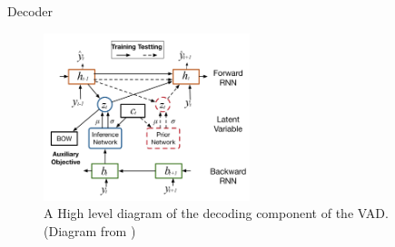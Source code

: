\documentclass[aspectratio=169, 11pt]{beamer}
\begin{document}
\begin{frame}{Decoder}
  \begin{figure}[!ht]
    \centering
    \includegraphics[width=60mm]{diagrams/vad_decoder.png}
    \caption{A High level diagram of the decoding component of the VAD. (Diagram from \cite{du_variational_2018})\label{r:vad_decoder}}
    \end{figure}
\end{frame}
\end{document}
